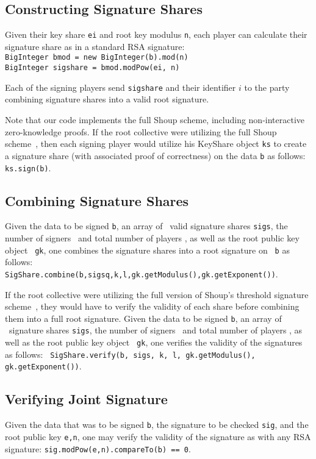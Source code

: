 \subsection{Constructing Signature Shares}

Given their key share {\tt ei} and root key modulus {\tt n}, each player can
calculate their signature share as in a standard RSA signature:\\
{\tt BigInteger bmod = new BigInteger(b).mod(n)} \\
{\tt BigInteger sigshare = bmod.modPow(ei, n)}

Each of the signing players send {\tt sigshare} and their identifier $i$ to
the party combining signature shares into a valid root signature.

Note that our code implements the full Shoup scheme, including non-interactive zero-knowledge proofs. If the root collective were utilizing the full Shoup
scheme~\cite{shoup-sig}, then each signing player would utilize his
KeyShare object {\tt ks} to create a signature share (with associated proof
of correctness) on the data {\tt b} as follows: {\tt ks.sign(b)}.

\subsection{Combining Signature Shares}

Given the data to be signed {\tt b}, an array of \nums\ valid
signature shares {\tt sigs}, the number of signers \nums\ and total
number of players \nump, as well as the root public key object {\tt
gk}, one combines the signature shares into a root signature on {\tt
b} as follows: {\tt
SigShare.combine(b,sigsq,k,l,gk.getModulus(),gk.getExponent())}.


If the root collective were utilizing the full version of Shoup's
threshold signature scheme~\cite{shoup-sig}, they would have to verify the
validity of each share before combining them into a full root
signature. Given the data to be signed {\tt b}, an array of \nums\
signature shares {\tt sigs}, the number of signers \nums\ and total
number of players \nump, as well as the root public key object {\tt
gk}, one verifies the validity of the signatures as follows: {\tt
SigShare.verify(b, sigs, k, l, gk.getModulus(), gk.getExponent())}.


\subsection{Verifying Joint Signature}

Given the data that was to be signed {\tt b}, the signature to be checked {\tt sig}, and the root public key {\tt e,n}, one may verify the validity of the signature as with any RSA signature:
{\tt sig.modPow(e,n).compareTo(b) == 0}.
